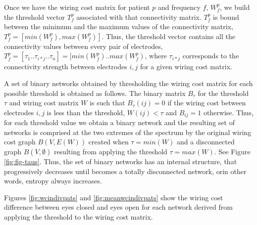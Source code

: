 \documentclass[11pt, onecolumn]{article}
\begin{document}
Once we have the wiring cost matrix for patient $p$ and frequency $f$, $W^p_{f}$, we build the threshold vector $T^p_{f}$  associated with that connectivity matrix. $T^p_{f}$ is bound between the minimum and the maximum values of the connectivity matrix, $T^p_{f} = [ min(W^p_{f}), max(W^p_{f}) ]$. Thus, the threshold vector  contains all the connectivity values between every pair of electrodes, $T^p_{f}= [\tau_1 .. \tau_{i*j} ..  \tau_n] = [min(W^p_{f}).. max(W^p_{f})$, where $\tau_{i*j}$ corresponds to the connectivity strength between electrodes $i,j$ for a given wiring cost matrix.
 
A set of binary networks obtained by thresholding the wiring cost matrix for each possible threshold is obtained as follows. The binary matrix $B_{\tau}$ for the threshold $\tau$ and wiring cost matrix $W$ is such that $B_{\tau}(ij) =0$ if the wiring cost between electrodes $i,j$ is less than the threshold, $W(ij) < \tau$ and $B_{ij}=1$ otherwise. 
Thus, for each threshold value we obtain a binary network and the resulting set of networks is comprised at the two extremes of the spectrum by the original wiring cost graph $B(V,E(W))$ created when $\tau = min(W)$ and a disconnected graph $B(V,\emptyset)$ resulting from applying the threshold $\tau = max(W)$. See Figure \ref{fig:fig-taus}. Thus, the set of binary networks has an internal structure, that progressively decreases until becomes a totally disconnected network, orin other words, entropy always increases.


Figures \ref{fig:wcindivpats} and \ref{fig:meanwcindivpats} show the wiring cost difference between eyes closed and eyes open for each network derived from applying the threshold to the wiring cost matrix.
\end{document}
